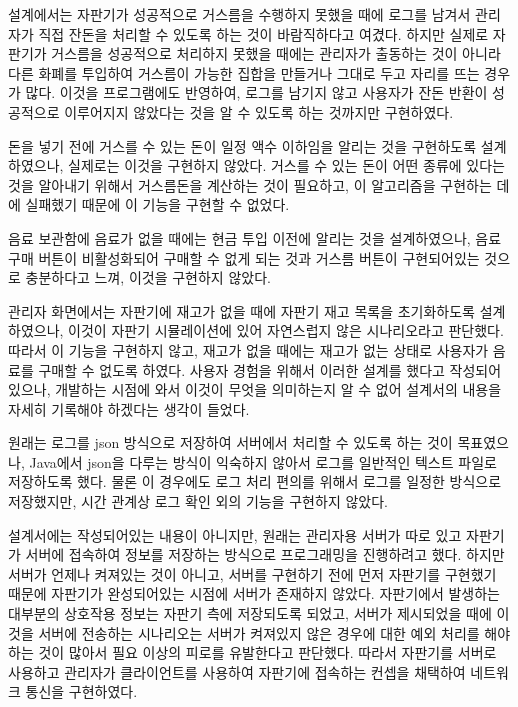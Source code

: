 \documentclass{oblivoir}
\begin{document}
    설계에서는 자판기가 성공적으로 거스름을 수행하지 못했을 때에
    로그를 남겨서 관리자가 직접 잔돈을 처리할 수 있도록 하는 것이 바람직하다고 여겼다.
    하지만 실제로 자판기가 거스름을 성공적으로 처리하지 못했을 때에는
    관리자가 출동하는 것이 아니라 다른 화폐를 투입하여 거스름이 가능한 집합을 만들거나
    그대로 두고 자리를 뜨는 경우가 많다.
    이것을 프로그램에도 반영하여,
    로그를 남기지 않고 사용자가 잔돈 반환이 성공적으로 이루어지지 않았다는 것을
    알 수 있도록 하는 것까지만 구현하였다.

    돈을 넣기 전에 거스를 수 있는 돈이 일정 액수 이하임을 알리는 것을 구현하도록 설계하였으나,
    실제로는 이것을 구현하지 않았다.
    거스를 수 있는 돈이 어떤 종류에 있다는 것을 알아내기 위해서 거스름돈을 계산하는 것이 필요하고,
    이 알고리즘을 구현하는 데에 실패했기 때문에 이 기능을 구현할 수 없었다.

    음료 보관함에 음료가 없을 때에는 현금 투입 이전에 알리는 것을 설계하였으나,
    음료 구매 버튼이 비활성화되어 구매할 수 없게 되는 것과
    거스름 버튼이 구현되어있는 것으로 충분하다고 느껴, 이것을 구현하지 않았다.

    관리자 화면에서는 자판기에 재고가 없을 때에 자판기 재고 목록을 초기화하도록 설계하였으나,
    이것이 자판기 시뮬레이션에 있어 자연스럽지 않은 시나리오라고 판단했다.
    따라서 이 기능을 구현하지 않고, 재고가 없을 때에는 재고가 없는 상태로
    사용자가 음료를 구매할 수 없도록 하였다.
    사용자 경험을 위해서 이러한 설계를 했다고 작성되어 있으나,
    개발하는 시점에 와서 이것이 무엇을 의미하는지 알 수 없어 설계서의 내용을 자세히 기록해야 하겠다는
    생각이 들었다.

    원래는 로그를 json 방식으로 저장하여 서버에서 처리할 수 있도록 하는 것이 목표였으나,
    Java에서 json을 다루는 방식이 익숙하지 않아서 로그를 일반적인 텍스트 파일로 저장하도록 했다.
    물론 이 경우에도 로그 처리 편의를 위해서 로그를 일정한 방식으로 저장했지만,
    시간 관계상 로그 확인 외의 기능을 구현하지 않았다.

    설계서에는 작성되어있는 내용이 아니지만, 원래는 관리자용 서버가 따로 있고
    자판기가 서버에 접속하여 정보를 저장하는 방식으로 프로그래밍을 진행하려고 했다.
    하지만 서버가 언제나 켜져있는 것이 아니고, 서버를 구현하기 전에 먼저 자판기를 구현했기 때문에
    자판기가 완성되어있는 시점에 서버가 존재하지 않았다.
    자판기에서 발생하는 대부분의 상호작용 정보는 자판기 측에 저장되도록 되었고,
    서버가 제시되었을 때에 이것을 서버에 전송하는 시나리오는
    서버가 켜져있지 않은 경우에 대한 예외 처리를 해야 하는 것이 많아서
    필요 이상의 피로를 유발한다고 판단했다.
    따라서 자판기를 서버로 사용하고 관리자가 클라이언트를 사용하여
    자판기에 접속하는 컨셉을 채택하여 네트워크 통신을 구현하였다.
\end{document}
